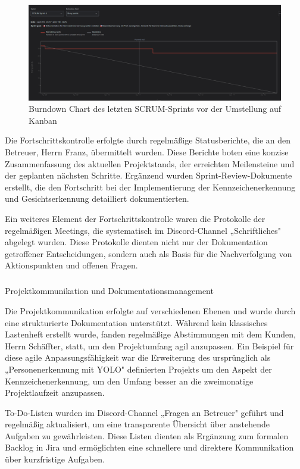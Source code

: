 \begin{figure}[h]
    \centering
    \includegraphics[width=1.0\textwidth]{data/burndown.png}
    \caption{Burndown Chart des letzten SCRUM-Sprints vor der Umstellung auf Kanban}
    \label{fig:burndown}
\end{figure}

Die Fortschrittskontrolle erfolgte durch regelmäßige Statusberichte, die an den Betreuer, Herrn Franz, übermittelt wurden. Diese Berichte boten eine konzise Zusammenfassung des aktuellen Projektstands, der erreichten Meilensteine und der geplanten nächsten Schritte. Ergänzend wurden Sprint-Review-Dokumente erstellt, die den Fortschritt bei der Implementierung der Kennzeichenerkennung und Gesichtserkennung detailliert dokumentierten.

Ein weiteres Element der Fortschrittskontrolle waren die Protokolle der regelmäßigen Meetings, die systematisch im Discord-Channel „Schriftliches" abgelegt wurden. Diese Protokolle dienten nicht nur der Dokumentation getroffener Entscheidungen, sondern auch als Basis für die Nachverfolgung von Aktionspunkten und offenen Fragen.

\subparagraph{}{Projektkommunikation und Dokumentationsmanagement}

Die Projektkommunikation erfolgte auf verschiedenen Ebenen und wurde durch eine strukturierte Dokumentation unterstützt. Während kein klassisches Lastenheft erstellt wurde, fanden regelmäßige Abstimmungen mit dem Kunden, Herrn Schäffter, statt, um den Projektumfang agil anzupassen. Ein Beispiel für diese agile Anpassungsfähigkeit war die Erweiterung des ursprünglich als „Personenerkennung mit YOLO" definierten Projekts um den Aspekt der Kennzeichenerkennung, um den Umfang besser an die zweimonatige Projektlaufzeit anzupassen.

To-Do-Listen wurden im Discord-Channel „Fragen an Betreuer" geführt und regelmäßig aktualisiert, um eine transparente Übersicht über anstehende Aufgaben zu gewährleisten. Diese Listen dienten als Ergänzung zum formalen Backlog in Jira und ermöglichten eine schnellere und direktere Kommunikation über kurzfristige Aufgaben.

